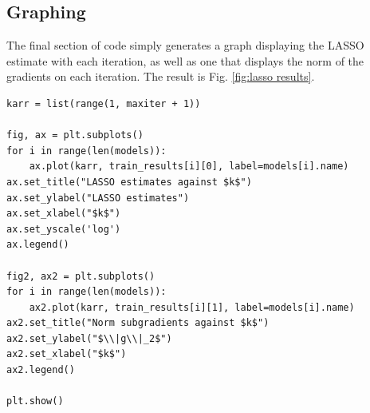 \documentclass[journal,onecolumn]{IEEEtran}
\begin{document}
\subsection{Graphing}
The final section of code simply generates a graph displaying the LASSO estimate with each iteration, as well as one that displays the norm of the gradients on each iteration. The result is Fig. \ref{fig:lasso results}.
\begin{verbatim}
karr = list(range(1, maxiter + 1))

fig, ax = plt.subplots()
for i in range(len(models)):
    ax.plot(karr, train_results[i][0], label=models[i].name)
ax.set_title("LASSO estimates against $k$")
ax.set_ylabel("LASSO estimates")
ax.set_xlabel("$k$")
ax.set_yscale('log')
ax.legend()

fig2, ax2 = plt.subplots()
for i in range(len(models)):
    ax2.plot(karr, train_results[i][1], label=models[i].name)
ax2.set_title("Norm subgradients against $k$")
ax2.set_ylabel("$\\|g\\|_2$")
ax2.set_xlabel("$k$")
ax2.legend()

plt.show()
\end{verbatim}
\end{document}
